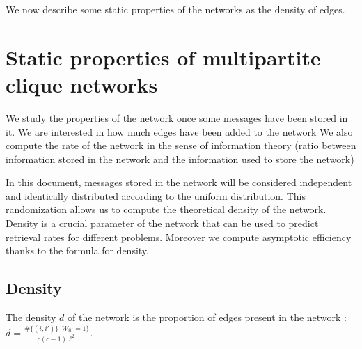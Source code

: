 \documentclass[english,10pt,twocolumn]{IEEEtran}
\renewcommand{\ge}{\geqslant}
\newcommand*\Let[2]{\State #1 $\gets$ #2}
\theoremstyle{definition}
\begin{document}
		
		
	
	We now describe some static properties of the networks as the density of edges.
	
	\section{Static properties of multipartite clique networks}	
	
	We study the properties of the network once some messages have been stored in it. We are interested in how much edges have been added to the network %
	We also compute the rate of the network in the sense of information theory (ratio between information stored in the network and the information used to store the network)
	
	In this document, messages stored in the network will be considered independent and identically distributed according to the uniform distribution. This randomization allows us to compute the theoretical density of the network. %
	Density is a crucial parameter of the network that can be used to predict retrieval rates for different problems. Moreover we compute asymptotic efficiency thanks to the formula for density.
	
	\subsection{Density}
		
	The density $d$ of the network is the proportion of edges present in the network : $d = \frac{\# \{(i, i') \} \, | W_{ii'} = 1 \}}{c(c-1)\ell^2}$.
	
\end{document}
